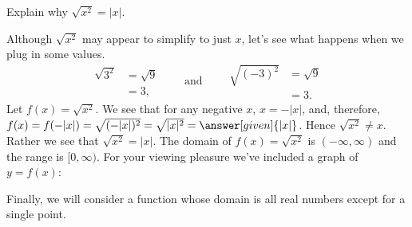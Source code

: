 \documentclass{ximera}
\begin{document}
\begin{example}
  Explain why $\sqrt{x^2} = |x|$.
  \begin{explanation}
    Although $\sqrt{x^2}$ may appear to simplify to just $x$, let's see
    what happens when we plug in some values.
    \[
    \begin{aligned}
    \sqrt{3^2} &= \sqrt{9}\\
    &=3,
    \end{aligned}
    \qquad\text{and}\qquad
    \begin{aligned}
      \sqrt{(-3)^2} &= \sqrt{9}\\
      &=3.
    \end{aligned}
    \]
    Let $f(x)=\sqrt{x^2}$. We see that for any negative $x$, $x=-|x|$, and, therefore, $f(x)=f(-|x|)=\sqrt{(-|x|)^2}=\sqrt{|x|^2}=\answer[given]{|x|}$.  Hence
    $\sqrt{x^2}\ne x$. Rather we see that $\sqrt{x^2} = |x|$.  The
    domain of $f(x)=\sqrt{x^2}$ is $(-\infty,\infty)$ and the range is
    $[0,\infty)$.  For your viewing pleasure we've included a graph of
      $y=f(x)$:
    \begin{image}
    \end{image}
  \end{explanation}
\end{example}

Finally, we will consider a function whose domain is all real numbers
except for a single point.
\end{document}
